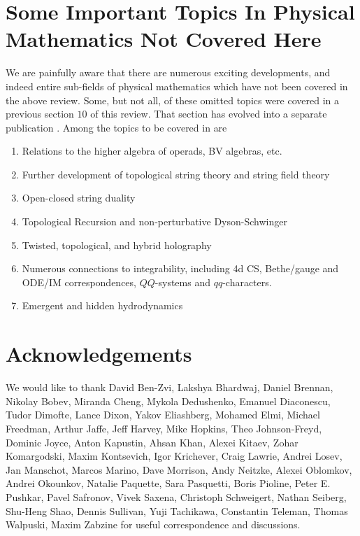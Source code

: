 \documentclass[12pt]{article}
\begin{document}

\section{Some Important Topics In Physical Mathematics Not Covered Here}\label{sec:Omissions}

We are painfully aware that there are numerous exciting developments, and indeed entire sub-fields of physical mathematics which have not been covered in the above review. Some, but not all,  of these omitted  topics were covered in a previous section $10$ of this review. That section has evolved into a separate publication \cite{Commando}. Among the topics to be covered in \cite{Commando} are 

\begin{enumerate} 

\item Relations to the higher algebra of operads, BV algebras, etc. 

\item Further development of topological string theory and string field theory

\item Open-closed string duality

\item Topological Recursion and non-perturbative Dyson-Schwinger

\item Twisted, topological, and hybrid holography

\item Numerous connections to integrability, including 4d CS, Bethe/gauge and ODE/IM correspondences, $QQ$-systems and $qq$-characters.

\item Emergent and hidden hydrodynamics 


\end{enumerate} 

 






 

\section{Acknowledgements}

 


We would like to thank  David Ben-Zvi, Lakshya Bhardwaj, Daniel Brennan, Nikolay Bobev, Miranda Cheng, Mykola Dedushenko,
Emanuel Diaconescu, Tudor Dimofte, Lance Dixon, Yakov Eliashberg, Mohamed Elmi, Michael Freedman, Arthur Jaffe, Jeff Harvey, Mike Hopkins, Theo Johnson-Freyd, 
Dominic Joyce, Anton Kapustin, Ahsan Khan, Alexei Kitaev, Zohar Komargodski, Maxim Kontsevich, Igor Krichever, Craig Lawrie, Andrei Losev, Jan Manschot, Marcos Marino, Dave Morrison, Andy Neitzke, Alexei Oblomkov, Andrei Okounkov, Natalie Paquette, Sara Pasquetti, Boris Pioline, Peter E. Pushkar, Pavel
Safronov, Vivek Saxena, Christoph Schweigert, Nathan Seiberg, Shu-Heng Shao, Dennis Sullivan, Yuji Tachikawa, Constantin Teleman, Thomas Walpuski,
Maxim Zabzine for useful correspondence and discussions.
\end{document}
